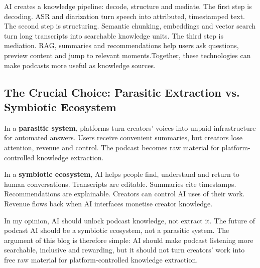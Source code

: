 \documentclass[11pt,a4paper]{article}
\begin{document}
AI creates a knowledge pipeline: decode, structure and mediate. The first step is decoding. ASR and diarization turn speech into attributed, timestamped text. The second step is structuring. Semantic chunking, embeddings and vector search turn long transcripts into searchable knowledge units. The third step is mediation. RAG, summaries and recommendations help users ask questions, preview content and jump to relevant moments.Together, these technologies can make podcasts more useful as knowledge sources.

\subsection{The Crucial Choice: Parasitic Extraction vs. Symbiotic Ecosystem}

In a \textbf{parasitic system}, platforms turn creators' voices into unpaid infrastructure for automated answers. Users receive convenient summaries, but creators lose attention, revenue and control. The podcast becomes raw material for platform-controlled knowledge extraction.

In a \textbf{symbiotic ecosystem}, AI helps people find, understand and return to human conversations. Transcripts are editable. Summaries cite timestamps. Recommendations are explainable. Creators can control AI uses of their work. Revenue flows back when AI interfaces monetise creator knowledge.


In my opinion, AI should unlock podcast knowledge, not extract it. The future of podcast AI should be a symbiotic ecosystem, not a parasitic system. The argument of this blog is therefore simple: AI should make podcast listening more searchable, inclusive and rewarding, but it should not turn creators' work into free raw material for platform-controlled knowledge extraction.
\end{document}
